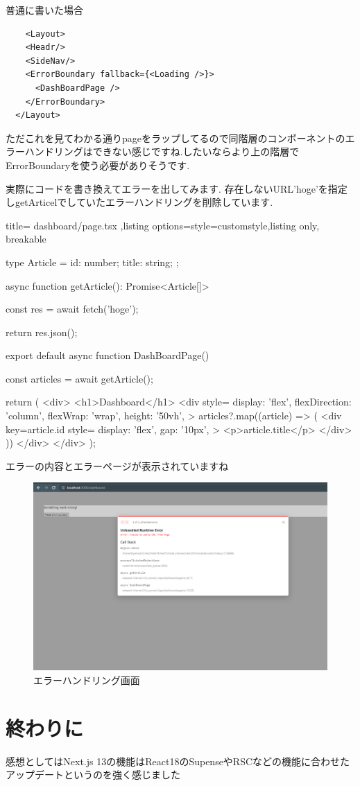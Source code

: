 普通に書いた場合



\begin{tcolorbox}[breakable]
  \begin{verbatim}
    <Layout>
    <Headr/>
    <SideNav/>
    <ErrorBoundary fallback={<Loading />}>
      <DashBoardPage />
    </ErrorBoundary>
  </Layout>
  \end{verbatim}
\end{tcolorbox}


ただこれを見てわかる通りpageをラップしてるので同階層のコンポーネントのエラーハンドリングはできない感じですね.したいならより上の階層でErrorBoundaryを使う必要がありそうです.

実際にコードを書き換えてエラーを出してみます.
存在しないURL'hoge'を指定しgetArticelでしていたエラーハンドリングを削除しています.


\begin{tcblisting}{title={
        dashboard/page.tsx
      },listing options={style=customstyle},listing only, breakable}

  type Article = {
  id: number;
  title: string;
  };

  async function getArticle(): Promise<Article[]> {
      const res = await fetch('hoge');

      return res.json();
    }

  export default async function DashBoardPage() {
  const articles = await getArticle();

  return (
  <div>
  <h1>Dashboard</h1>
  <div
  style={{
      display: 'flex',
      flexDirection: 'column',
      flexWrap: 'wrap',
      height: '50vh',
    }}
  >
  {articles?.map((article) => (
  <div
  key={article.id}
  style={{
      display: 'flex',
      gap: '10px',
    }}
  >
    <p>{article.title}</p>
  </div>
  ))}
  </div>
  </div>
  );
  }

\end{tcblisting}


エラーの内容とエラーページが表示されていますね


\begin{figure}[H]
  \centering
  \includegraphics[width=12cm]{./image/03-Tech/chap4/08.png}
  \caption{エラーハンドリング画面}
\end{figure}



\section{終わりに}
感想としてはNext.js 13の機能はReact18のSupenseやRSCなどの機能に合わせたアップデートというのを強く感じました